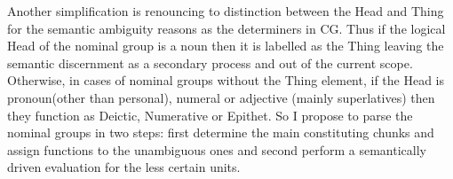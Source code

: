 	
	Another simplification is renouncing to distinction between the Head and Thing \citep[p.~390--396]{Halliday2013} for the semantic ambiguity reasons as the determiners in CG. Thus if the logical Head of the nominal group is a noun then it is labelled as the Thing leaving the semantic discernment as a secondary process and out of the current scope. Otherwise, in cases of nominal groups without the Thing element, if the Head is pronoun(other than personal), numeral or adjective (mainly superlatives) then they function as Deictic, Numerative or Epithet. So I propose to parse the nominal groups in two steps: first determine the main constituting chunks and assign functions to the unambiguous ones and second perform a semantically driven evaluation for the less certain units.
	
